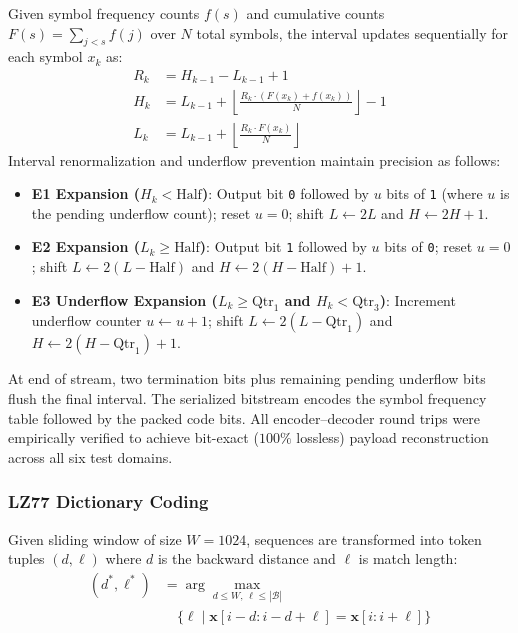 \documentclass[conference]{IEEEtran}
\begin{document}
Given symbol frequency counts $f(s)$ and cumulative counts $F(s) = \sum_{j < s} f(j)$ over $N$ total symbols, the interval updates sequentially for each symbol $x_k$ as:
\begin{align}
    R_k &= H_{k-1} - L_{k-1} + 1 \\
    H_k &= L_{k-1} + \left\lfloor \frac{R_k \cdot (F(x_k) + f(x_k))}{N} \right\rfloor - 1 \\
    L_k &= L_{k-1} + \left\lfloor \frac{R_k \cdot F(x_k)}{N} \right\rfloor
\end{align}
Interval renormalization and underflow prevention maintain precision as follows:
\begin{itemize}
    \item \textbf{E1 Expansion ($H_k < \text{Half}$)}: Output bit \texttt{0} followed by $u$ bits of \texttt{1} (where $u$ is the pending underflow count); reset $u=0$; shift $L \leftarrow 2L$ and $H \leftarrow 2H + 1$.
    \item \textbf{E2 Expansion ($L_k \ge \text{Half}$)}: Output bit \texttt{1} followed by $u$ bits of \texttt{0}; reset $u=0$; shift $L \leftarrow 2(L - \text{Half})$ and $H \leftarrow 2(H - \text{Half}) + 1$.
    \item \textbf{E3 Underflow Expansion ($L_k \ge \text{Qtr}_1$ and $H_k < \text{Qtr}_3$)}: Increment underflow counter $u \leftarrow u + 1$; shift $L \leftarrow 2(L - \text{Qtr}_1)$ and $H \leftarrow 2(H - \text{Qtr}_1) + 1$.
\end{itemize}
At end of stream, two termination bits plus remaining pending underflow bits flush the final interval. The serialized bitstream encodes the symbol frequency table followed by the packed code bits. All encoder--decoder round trips were empirically verified to achieve bit-exact ($100\%$ lossless) payload reconstruction across all six test domains.

\subsubsection{LZ77 Dictionary Coding}
Given sliding window of size $W=1024$, sequences are transformed into token tuples $(d, \ell)$ where $d$ is the backward distance and $\ell$ is match length:
\begin{equation}
    \begin{split}
    (d^*, \ell^*) &= \arg\max_{d \le W,\, \ell \le |\mathcal{B}|} \\
    &\quad \{\ell \mid \mathbf{x}[i-d : i-d+\ell] = \mathbf{x}[i : i+\ell]\}
    \end{split}
\end{equation}
\end{document}
